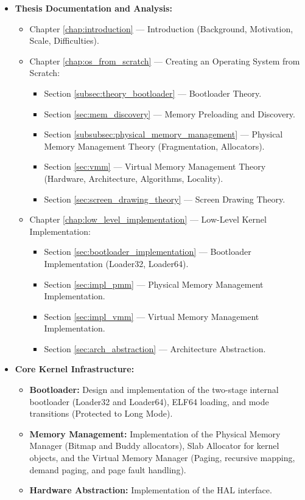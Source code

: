 \documentclass[a4paper,10pt,twoside]{report}
\theoremstyle{definition}
\begin{document}
\begin{itemize}
    \item \textbf{Thesis Documentation and Analysis:}
        \begin{itemize}
            \item Chapter \ref{chap:introduction} --- Introduction (Background, Motivation, Scale, Difficulties).
            \item Chapter \ref{chap:os_from_scratch} --- Creating an Operating System from Scratch:
            \begin{itemize}
                \item Section \ref{subsec:theory_bootloader} --- Bootloader Theory.
                \item Section \ref{sec:mem_discovery} --- Memory Preloading and Discovery.
                \item Section \ref{subsubsec:physical_memory_management} --- Physical Memory Management Theory (Fragmentation, Allocators).
                \item Section \ref{sec:vmm} --- Virtual Memory Management Theory (Hardware, Architecture, Algorithms, Locality).
                \item Section \ref{sec:screen_drawing_theory} --- Screen Drawing Theory.
            \end{itemize}
            \item Chapter \ref{chap:low_level_implementation} --- Low-Level Kernel Implementation:
            \begin{itemize}
                \item Section \ref{sec:bootloader_implementation} --- Bootloader Implementation (Loader32, Loader64).
                \item Section \ref{sec:impl_pmm} --- Physical Memory Management Implementation.
                \item Section \ref{sec:impl_vmm} --- Virtual Memory Management Implementation.
                \item Section \ref{sec:arch_abstraction} --- Architecture Abstraction.
            \end{itemize}
        \end{itemize}

    \item \textbf{Core Kernel Infrastructure:}
        \begin{itemize}
            \item \textbf{Bootloader:} Design and implementation of the two-stage internal bootloader (Loader32 and Loader64), ELF64 loading, and mode transitions (Protected to Long Mode).
            \item \textbf{Memory Management:} Implementation of the Physical Memory Manager (Bitmap and Buddy allocators), Slab Allocator for kernel objects, and the Virtual Memory Manager (Paging, recursive mapping, demand paging, and page fault handling).
            \item \textbf{Hardware Abstraction:} Implementation of the HAL interface.
        \end{itemize}


\end{itemize}
\end{document}
